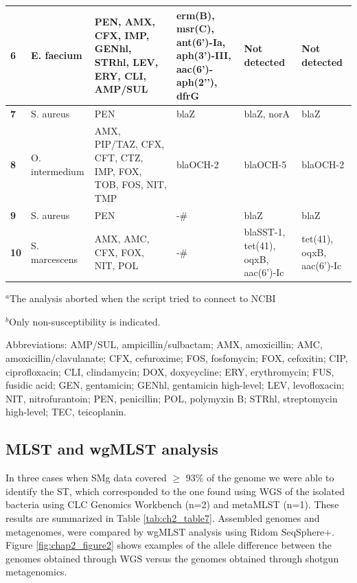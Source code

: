 \begin{table}[]
{\begin{tabular}{@{}|l|l|l|l|ll|@{}}
\textbf{6} &
  E. faecium &
  PEN, AMX, CFX, IMP, GENhl, STRhl, LEV, ERY, CLI, AMP/SUL &
  erm(B), msr(C), ant(6’)-Ia, aph(3’)-III, aac(6’)-aph(2’’), dfrG &
  \multicolumn{1}{l|}{Not detected} &
  Not detected \\ \midrule
\textbf{7} &
  S. aureus &
  PEN &
  blaZ &
  \multicolumn{1}{l|}{blaZ, norA} &
  blaZ \\ \midrule
\textbf{8} &
  O. intermedium &
  AMX, PIP/TAZ, CFX, CFT, CTZ, IMP, FOX, TOB, FOS, NIT, TMP &
  blaOCH-2 &
  \multicolumn{1}{l|}{blaOCH-5} &
  blaOCH-2 \\ \midrule
\textbf{9} &
  S. aureus &
  PEN &
  -\# &
  \multicolumn{1}{l|}{blaZ} &
  blaZ \\ \midrule
\textbf{10} &
  S. marcescens &
  AMX, AMC, CFX, FOX, NIT, POL &
  -\# &
  \multicolumn{1}{l|}{blaSST-1, tet(41), oqxB, aac(6’)-Ic} &
  tet(41), oqxB, aac(6’)-Ic \\ \bottomrule
\end{tabular}%
}
\item $^a$The analysis aborted when the script tried to connect to NCBI
\item $^b$Only non-susceptibility is indicated. \item Abbreviations: AMP/SUL, ampicillin/sulbactam; AMX, amoxicillin; AMC, amoxicillin/clavulanate; CFX, cefuroxime; FOS, fosfomycin; FOX, cefoxitin; CIP, ciprofloxacin; CLI, clindamycin; DOX, doxycycline; ERY, erythromycin; FUS, fusidic acid; GEN, gentamicin; GENhl, gentamicin high-level; LEV, levofloxacin; NIT, nitrofurantoin; PEN, penicillin; POL, polymyxin B; STRhl, streptomycin high-level; TEC, teicoplanin.
\end{table}

\subsection{MLST and wgMLST analysis}
 
In three cases when SMg data covered $\geq$ 93\% of the genome we were able to identify the ST, which corresponded to the one found using WGS of the isolated bacteria using CLC Genomics Workbench (n=2) and metaMLST (n=1). 
These results are summarized in Table \ref{tab:ch2_table7}.
Assembled genomes and metagenomes, were compared by wgMLST analysis using Ridom SeqSphere+. 
Figure \ref{fig:chap2_figure2} shows examples of the allele difference between the genomes obtained through WGS versus the genomes obtained through shotgun metagenomics.

